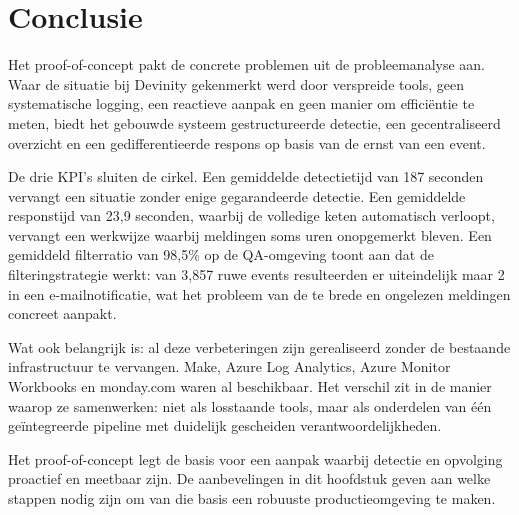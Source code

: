 
\newpage

\section{Conclusie}

Het proof-of-concept pakt de concrete problemen uit de probleemanalyse aan. Waar de situatie bij Devinity gekenmerkt werd door verspreide tools, geen systematische logging, een reactieve aanpak en geen manier om efficiëntie te meten, biedt het gebouwde systeem gestructureerde detectie, een gecentraliseerd overzicht en een gedifferentieerde respons op basis van de ernst van een event.

De drie KPI's sluiten de cirkel. Een gemiddelde detectietijd van 187 seconden vervangt een situatie zonder enige gegarandeerde detectie. Een gemiddelde responstijd van 23,9 seconden, waarbij de volledige keten automatisch verloopt, vervangt een werkwijze waarbij meldingen soms uren onopgemerkt bleven. Een gemiddeld filterratio van 98,5\% op de QA-omgeving toont aan dat de filteringstrategie werkt: van 3,857 ruwe events resulteerden er uiteindelijk maar 2 in een e-mailnotificatie, wat het probleem van de te brede en ongelezen meldingen concreet aanpakt.

Wat ook belangrijk is: al deze verbeteringen zijn gerealiseerd zonder de bestaande infrastructuur te vervangen. Make, Azure Log Analytics, Azure Monitor Workbooks en monday.com waren al beschikbaar. Het verschil zit in de manier waarop ze samenwerken: niet als losstaande tools, maar als onderdelen van één geïntegreerde pipeline met duidelijk gescheiden verantwoordelijkheden.

Het proof-of-concept legt de basis voor een aanpak waarbij detectie en opvolging proactief en meetbaar zijn. De aanbevelingen in dit hoofdstuk geven aan welke stappen nodig zijn om van die basis een robuuste productieomgeving te maken.